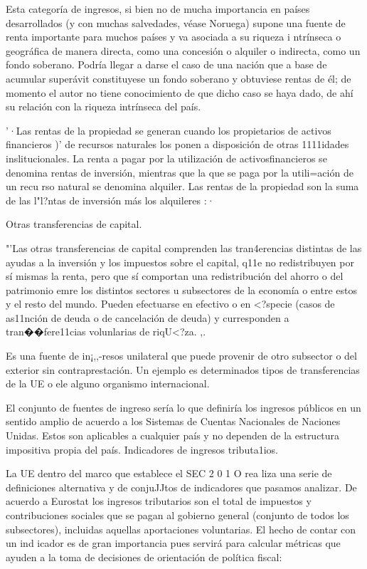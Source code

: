\documentclass[10pt,a4paper]{article}
\begin{document}
{Esta categoría de ingresos, si bien no de mucha importancia en países desarrollados (y con muchas salvedades, véase Noruega) supone una fuente de renta importante para muchos países y va asociada a su riqueza i ntrínseca o geográfica de manera directa, como una concesión o alquiler o indirecta, como un fondo soberano. Podría llegar a darse el caso de una nación que a base de acumular superávit constituyese un fondo soberano y obtuviese rentas de él; de momento el autor no tiene conocimiento de que dicho caso se haya dado, de ahí su relación con la riqueza intrínseca del país.

'·Las rentas de la propiedad se generan cuando los propietarios de activos financieros )' de recursos naturales los ponen a disposición de otras 1111idades inslitucionales. La renta a pagar por la utilización de activosfinancieros se denomina rentas de inversión, mientras que la que se paga por la utili=ación de un recu rso natural se denomina alquiler. Las rentas de la propiedad son la suma de las l"l?ntas de inversión más los alquileres :·

Otras transferencias de capital.

"'Las otras transferencias de capital comprenden las tran4erencias distintas de las ayudas a la inversión y los impuestos sobre el capital, q11e no redistribuyen por sí mismas la renta, pero que sí comportan una redistribución del ahorro o del patrimonio emre los distintos sectores u subsectores de la economía o entre estos y el resto del mundo. Pueden efectuarse en efectivo o en <?specie (casos de as11nción de deuda o de cancelación de deuda) y curresponden a tran��fere11cias volunlarias de riqU<?za. ,.

Es una fuente de in¡,,-resos unilateral que puede provenir de otro subsector o del exterior sin contraprestación. Un ejemplo es determinados tipos de transferencias de la UE o ele alguno organismo internacional.

El conjunto de fuentes de ingreso sería lo que definiría los ingresos públicos en un sentido amplio de acuerdo a los Sistemas de Cuentas Nacionales de Naciones Unidas. Estos son aplicables a cualquier país y no dependen de la estructura impositiva propia del país. Indicadores de ingresos tributa1ios.

La UE dentro del marco que establece el SEC 2 0 1 O rea liza una serie de definiciones alternativa y de conjuJJtos de indicadores que pasamos analizar. De acuerdo a Eurostat los ingresos tributarios son el total de impuestos y contribuciones sociales que se pagan al gobierno general (conjunto de todos los subsectores), incluidas aquellas aportaciones voluntarias. El hecho de contar con un ind icador es de gran importancia pues servirá para calcular métricas que ayuden a la toma de decisiones de orientación de política fiscal:

}
\end{document}

